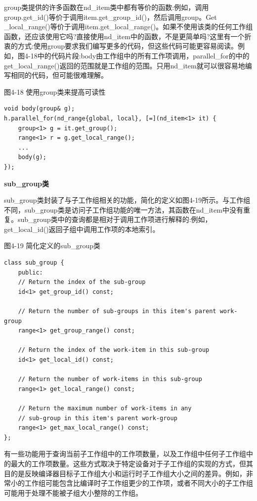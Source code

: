 group类提供的许多函数在nd\_item类中都有等价的函数:例如，调用group.get\_id()等价于调用item.get\_group\_id()，然后调用group。Get \_local\_range()等价于调用item.get\_local\_range()。如果不使用该类的任何工作组函数，还应该使用它吗?直接使用nd\_item中的函数，不是更简单吗?这里有一个折衷的方式:使用group要求我们编写更多的代码，但这些代码可能更容易阅读。例如，图4-18中的代码片段:body由工作组中的所有工作项调用，parallel\_for的中的get\_local\_range()返回的范围就是工作组的范围。只用nd\_item就可以很容易地编写相同的代码，但可能很难理解。\par

\hspace*{\fill} \par %
图4-18 使用group类来提高可读性
\begin{lstlisting}[caption={}]
void body(group& g);
h.parallel_for(nd_range{global, local}, [=](nd_item<1> it) {
	group<1> g = it.get_group();
	range<1> r = g.get_local_range();
	...
	body(g);
});
\end{lstlisting}

\hspace*{\fill} \par %
\textbf{sub\_group类}

sub\_group类封装了与子工作组相关的功能，简化的定义如图4-19所示。与工作组不同，sub\_group类是访问子工作组功能的唯一方法，其函数在nd\_item中没有重复。sub\_group类中的查询都是相对于调用工作项进行解释的:例如，get\_local\_id()返回子组中调用工作项的本地索引。\par

\hspace*{\fill} \par %
图4-19 简化定义的sub\_group类
\begin{lstlisting}[caption={}]
class sub_group {
	public:
	// Return the index of the sub-group
	id<1> get_group_id() const;
	
	// Return the number of sub-groups in this item's parent work-group
	range<1> get_group_range() const;
	
	// Return the index of the work-item in this sub-group
	id<1> get_local_id() const;
	
	// Return the number of work-items in this sub-group
	range<1> get_local_range() const;
	
	// Return the maximum number of work-items in any 
	// sub-group in this item's parent work-group
	range<1> get_max_local_range() const;
};
\end{lstlisting}

有一些功能用于查询当前子工作组中的工作项数量，以及工作组中任何子工作组中的最大的工作项数量。这些方式取决于特定设备对于子工作组的实现的方式，但其目的是反映编译器目标子工作组大小和运行时子工作组大小之间的差异。例如，非常小的工作组可能包含比编译时子工作组更少的工作项，或者不同大小的子工作组可能用于处理不能被子组大小整除的工作组。\par





